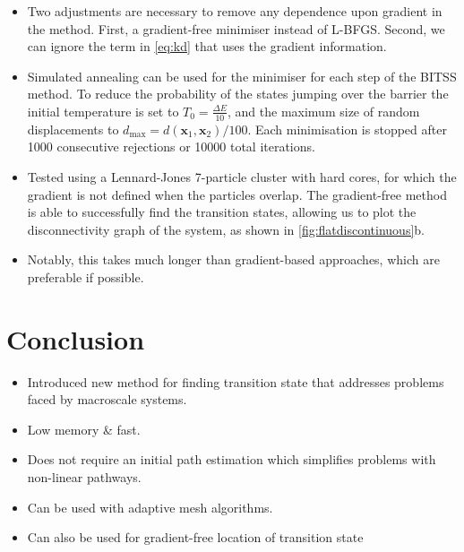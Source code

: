 \documentclass[aps,twocolumn]{revtex4}
\begin{document}
\begin{itemize}
\item
Two adjustments are necessary to remove any dependence upon gradient in the method.
First, a gradient-free minimiser instead of L-BFGS.
Second, we can ignore the term in \cref{eq:kd} that uses the gradient information.
\item
Simulated annealing can be used for the minimiser for each step of the BITSS method.
To reduce the probability of the states jumping over the barrier the initial temperature is set to $T_0 = \frac{\Delta E}{10}$, and the maximum size of random displacements to $d_\text{max} = d(\bm{x}_1, \bm{x}_2) / 100$.
Each minimisation is stopped after 1000 consecutive rejections or 10000 total iterations.
\item
Tested using a Lennard-Jones 7-particle cluster with hard cores, for which the gradient is not defined when the particles overlap.
The gradient-free method is able to successfully find the transition states, allowing us to plot the disconnectivity graph of the system, as shown in \cref{fig:flatdiscontinuous}b.
\item
Notably, this takes much longer than gradient-based approaches, which are preferable if possible.
\end{itemize}


\section{Conclusion}
\begin{itemize}
\item
Introduced new method for finding transition state that addresses problems faced by macroscale systems.
\item
Low memory \& fast.
\item
Does not require an initial path estimation which simplifies problems with non-linear pathways.
\item
Can be used with adaptive mesh algorithms.
\item
Can also be used for gradient-free location of transition state
\end{itemize}




\end{document}
